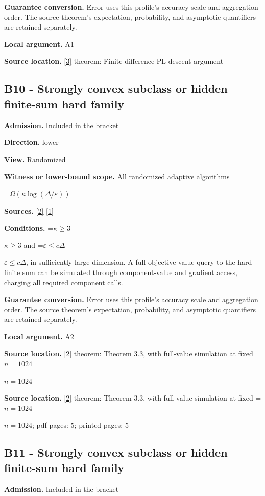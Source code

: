 \documentclass[10pt,a4paper]{article}
\newcommand{\AtlasMath}[1]{\par\begingroup\centering\setbox0=\hbox{$\displaystyle #1$}\ifdim\wd0>1.4\linewidth\typeout{ATLAS WIDE FORMULA: \the\wd0}\fi\ifdim\wd0>\linewidth\resizebox{\linewidth}{!}{\box0}\else\box0\fi\par\endgroup}
\newcommand{\AtlasInlineMath}[1]{\begingroup\setbox0=\hbox{$#1$}\ifdim\wd0>.4\linewidth\endgroup\AtlasMath{#1}\else\endgroup$#1$\fi}
\begin{document}
\textbf{Guarantee conversion.} Error uses this profile's accuracy scale and aggregation order. The source theorem's expectation, probability, and asymptotic quantifiers are retained separately.

\textbf{Local argument.} A1

\textbf{Source location.} \href{https://proceedings.mlr.press/v195/yue23a/yue23a.pdf}{[3]} theorem: Finite-difference PL descent argument

\subsection{B10 - Strongly convex subclass or hidden finite-sum hard family}
\textbf{Admission.} Included in the bracket

\textbf{Direction.} lower

\textbf{View.} Randomized

\textbf{Witness or lower-bound scope.} All randomized adaptive algorithms

\AtlasMath{\Omega(\kappa\log(\Delta/\varepsilon))}
\textbf{Sources.} \href{https://arxiv.org/html/2609.00045v3}{[2]} \href{https://arxiv.org/html/2610.00345v1}{[1]}

\textbf{Conditions.} \AtlasInlineMath{\kappa\ge3} and \AtlasInlineMath{\varepsilon\le c\Delta}, in sufficiently large dimension. A full objective-value query to the hard finite sum can be simulated through component-value and gradient access, charging all required component calls.

\textbf{Guarantee conversion.} Error uses this profile's accuracy scale and aggregation order. The source theorem's expectation, probability, and asymptotic quantifiers are retained separately.

\textbf{Local argument.} A2

\textbf{Source location.} \href{https://arxiv.org/html/2609.00045v3}{[2]} theorem: Theorem 3.3, with full-value simulation at fixed \AtlasInlineMath{n=1024}

\textbf{Source location.} \href{https://arxiv.org/html/2609.00045v3}{[2]} theorem: Theorem 3.3, with full-value simulation at fixed \AtlasInlineMath{n=1024}; pdf pages: 5; printed pages: 5

\subsection{B11 - Strongly convex subclass or hidden finite-sum hard family}
\textbf{Admission.} Included in the bracket
\end{document}
